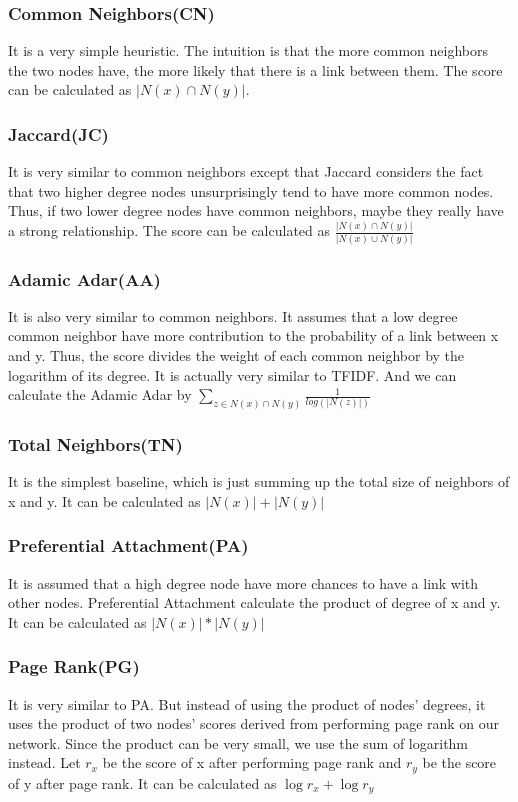 \documentclass[12pt]{article}
\begin{document}
\subsubsection{Common Neighbors(CN)}
It is a very simple heuristic. The intuition is that the more common neighbors the two nodes have, the more likely that there is a link between them. The score can be calculated as $|N(x) \cap N(y)|$.
\subsubsection{Jaccard(JC)}
It is very similar to common neighbors except that Jaccard considers the fact that two higher degree nodes unsurprisingly tend to have more common nodes. Thus, if two lower degree nodes have common neighbors, maybe they really have a strong relationship. The score can be calculated as $\frac{|N(x) \cap N(y)|}{|N(x) \cup N(y)|}$
\subsubsection{Adamic Adar(AA)}
It is also very similar to common neighbors. It assumes that a low degree common neighbor have more contribution to the probability of a link between x and y. Thus, the score divides the weight of each common neighbor by the logarithm of its degree. It is actually very similar to TFIDF. And we can calculate the Adamic Adar by $\sum_{z \in N(x) \cap N(y)}{\frac{1}{log(|N(z)|)}}$
\subsubsection{Total Neighbors(TN)}
It is the simplest baseline, which is just summing up the total size of neighbors of x and y. It can be calculated as $|N(x)| + |N(y)|$
\subsubsection{Preferential Attachment(PA)}
It is assumed that a high degree node have more chances to have a link with other nodes. Preferential Attachment calculate the product of degree of x and y. It can be calculated as $|N(x)| * |N(y)|$
\subsubsection{Page Rank(PG)}
It is very similar to PA. But instead of using the product of nodes' degrees, it uses the product of two nodes' scores derived from performing page rank on our network. Since the product can be very small, we use the sum of logarithm instead. Let $r_x$ be the score of x after performing page rank and $r_y$ be the score of y after page rank. It can be calculated as $\log{r_x} + \log{r_y}$
\end{document}
